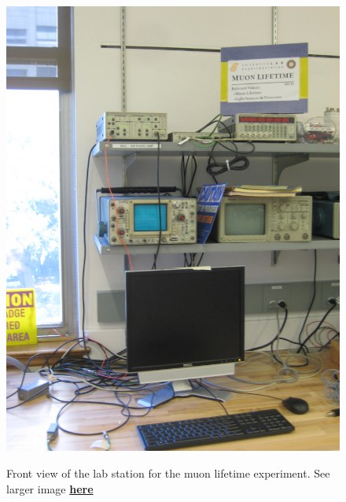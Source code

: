 \documentclass{../lab}
\begin{document}
\begin{figure}[h]
\begin{minipage}{0.24\textwidth}
    \href{http://experimentationlab.berkeley.edu/sites/default/files/images/MUO_3517.jpg}{\includegraphics[width=\linewidth,keepaspectratio]{images/MUO_3517.jpg}}
    \caption{Front view of the lab station for the muon lifetime experiment. See larger image \href{http://experimentationlab.berkeley.edu/sites/default/files/images/MUO_3517.jpg}{\textbf{here}}}
\end{minipage}
\begin{minipage}{0.18\textwidth}

\end{minipage}
\end{figure}
\end{document}
